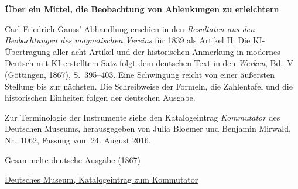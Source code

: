 \clearpage
\thispagestyle{empty}
\begin{center}\Large\textbf{Über ein Mittel, die Beobachtung von Ablenkungen zu erleichtern}\end{center}

Carl Friedrich Gauss’ Abhandlung erschien in den \textit{Resultaten aus den Beobachtungen des magnetischen Vereins} für 1839 als Artikel II. Die KI-Übertragung aller acht Artikel und der historischen Anmerkung in modernes Deutsch mit KI-erstelltem Satz folgt dem deutschen Text in den \textit{Werken}, Bd.~V (Göttingen, 1867), S.~395--403. Eine Schwingung reicht von einer äußersten Stellung bis zur nächsten. Die Schreibweise der Formeln, die Zahlentafel und die historischen Einheiten folgen der deutschen Ausgabe.

\medskip\noindent
Zur Terminologie der Instrumente siehe den Katalogeintrag \textit{Kommutator} des Deutschen Museums, herausgegeben von Julia Bloemer und Benjamin Mirwald, Nr.~1062, Fassung vom 24. August 2016.

\medskip\noindent
\href{https://gdz.sub.uni-goettingen.de/id/PPN236006339}{Gesammelte deutsche Ausgabe (1867)}\par
\noindent\href{https://digital.deutsches-museum.de/projekte/gruendungssammlung/detail/1062/}{Deutsches Museum, Katalogeintrag zum Kommutator}
\clearpage
